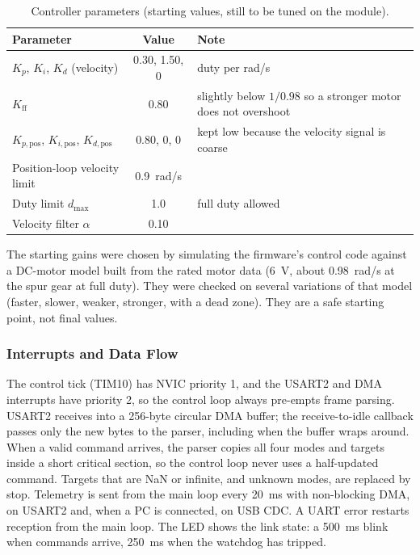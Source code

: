 \documentclass[12pt,a4paper]{article}
\begin{document}
\begin{table}[H]
\centering
\caption{Controller parameters (starting values, still to be tuned on the module).}
\label{pr3:tab:gains}
\small
\begin{tabular}{l c p{6.2cm}}
\toprule
Parameter & Value & Note \\
\midrule
$K_p$, $K_i$, $K_d$ (velocity) & 0.30, 1.50, 0 & duty per rad/s \\
$K_\text{ff}$ & 0.80 & slightly below $1/0.98$ so a stronger motor does not overshoot \\
$K_{p,\text{pos}}$, $K_{i,\text{pos}}$, $K_{d,\text{pos}}$ & 0.80, 0, 0 & kept low because the velocity signal is coarse \\
Position-loop velocity limit & \SI{0.9}{rad/s} & \\
Duty limit $d_\text{max}$ & 1.0 & full duty allowed \\
Velocity filter $\alpha$ & 0.10 & \\
\bottomrule
\end{tabular}
\end{table}

The starting gains were chosen by simulating the firmware's control code against a DC-motor
model built from the rated motor data (\SI{6}{V}, about \SI{0.98}{rad/s} at the spur gear at
full duty). They were checked on several variations of that model (faster, slower, weaker,
stronger, with a dead zone). They are a safe starting point, not final values.

\subsubsection{Interrupts and Data Flow}

The control tick (TIM10) has NVIC priority 1, and the USART2 and DMA interrupts have
priority 2, so the control loop always pre-empts frame parsing. USART2 receives into a
256-byte circular DMA buffer; the receive-to-idle callback passes only the new bytes to the
parser, including when the buffer wraps around. When a valid command arrives, the parser
copies all four modes and targets inside a short critical section, so the control loop never
uses a half-updated command. Targets that are NaN or infinite, and unknown modes, are replaced
by stop. Telemetry is sent from the main loop every \SI{20}{ms} with non-blocking DMA, on
USART2 and, when a PC is connected, on USB CDC. A UART error restarts reception from the main
loop. The LED shows the link state: a \SI{500}{ms} blink when commands arrive, \SI{250}{ms}
when the watchdog has tripped.
\end{document}
